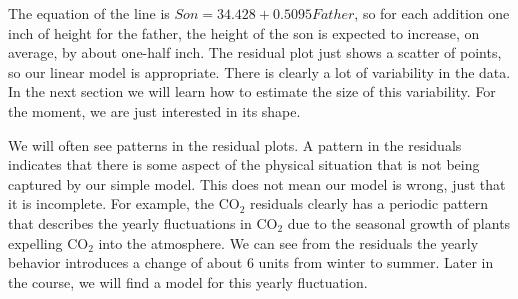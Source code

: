 \documentclass[10pt,]{book}
\theoremstyle{ptxdefinitionnotitle}
\theoremstyle{ptxdefinitiontitle}
\numberwithin{equation}{section}
\begin{document}
 The equation of the line is \(Son = 34.428 + 0.5095 Father\), so for each addition one inch of height for the father, the height of the son is expected to increase, on average, by about one-half inch. The residual plot just shows a scatter of points, so our linear model is appropriate.  There is clearly a lot of variability in the data. In the next section we will learn how to estimate the size of this variability. For the moment, we are just interested in its shape.%
\par
\hypertarget{p-103}{}%
We will often see patterns in the residual plots.  A pattern in the residuals indicates that there is some aspect of the physical situation that is not being captured by our simple model. This does not mean our model is wrong, just that it is incomplete. For example, the \(\text{CO}_2\) residuals clearly has a periodic pattern that describes the yearly fluctuations in \(\text{CO}_2\) due to the seasonal growth of plants expelling \(\text{CO}_2\) into the atmosphere. We can see from the residuals the yearly behavior introduces a change of about \(6\) units from winter to summer.  Later in the course, we will find a model for this yearly fluctuation.%
\end{document}

